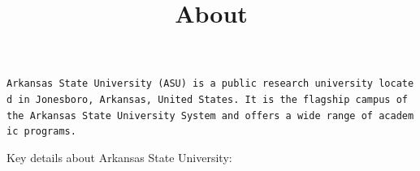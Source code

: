 \documentclass[
  letterpaper,
  DIV=11,
  numbers=noendperiod]{scrartcl}
\title{About}
\author{}
\date{}
\begin{document}
\maketitle
\ifdefined\Shaded\renewenvironment{Shaded}{\begin{tcolorbox}[frame hidden, boxrule=0pt, enhanced, interior hidden, borderline west={3pt}{0pt}{shadecolor}, breakable, sharp corners]}{\end{tcolorbox}}\fi

\texttt{Arkansas\ State\ University\ (ASU)\ is\ a\ public\ research\ university\ located\ in\ Jonesboro,\ Arkansas,\ United\ States.\ It\ is\ the\ flagship\ campus\ of\ the\ Arkansas\ State\ University\ System\ and\ offers\ a\ wide\ range\ of\ academic\ programs.}

Key details about Arkansas State University:
\end{document}
